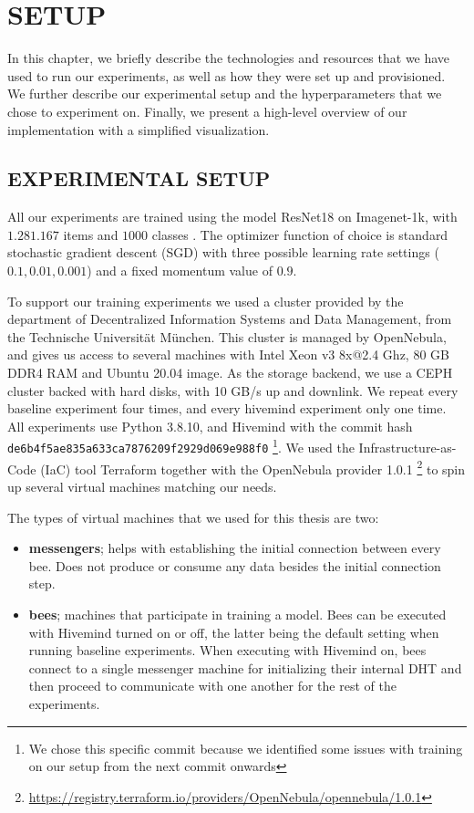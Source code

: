 \chapter{SETUP}\label{chapter:setup}

In this chapter, we briefly describe the technologies and resources that we have used to run our experiments, as well as how they were set up and provisioned.
We further describe our experimental setup and the hyperparameters that we chose to experiment on.
Finally, we present a high-level overview of our implementation with a simplified visualization.

\section{EXPERIMENTAL SETUP}

All our experiments are trained using the model ResNet18 \cite{he2015deep} on Imagenet-1k, with $1.281.167$ items and $1000$ classes \cite{deng2009imagenet}.
The optimizer function of choice is standard stochastic gradient descent (SGD) with three possible learning rate settings ($0.1, 0.01, 0.001$) and a fixed momentum value of $0.9$.

To support our training experiments we used a cluster provided by the department of Decentralized Information Systems and Data Management, from the Technische Universität München.
This cluster is managed by OpenNebula, and gives us access to several machines with Intel Xeon v3 8x@2.4 Ghz, 80 GB DDR4 RAM and Ubuntu 20.04 image.
As the storage backend, we use a CEPH cluster backed with hard disks, with 10 GB/s up and downlink.
We repeat every baseline experiment four times, and every hivemind experiment only one time.
All experiments use Python 3.8.10, and Hivemind with the commit hash \texttt{de6b4f5ae835a633ca7876209f2929d069e988f0}
\footnote{We chose this specific commit because we identified some issues with training on our setup from the next commit onwards}.
We used the Infrastructure-as-Code (IaC) tool Terraform together with the OpenNebula provider 1.0.1
\footnote{\href{https://registry.terraform.io/providers/OpenNebula/opennebula/1.0.1}{https://registry.terraform.io/providers/OpenNebula/opennebula/1.0.1}}
to spin up several virtual machines matching our needs.

The types of virtual machines that we used for this thesis are two:
\begin{itemize}
    \item \textbf{messengers}; helps with establishing the initial connection between every bee.
          Does not produce or consume any data besides the initial connection step.
    \item \textbf{bees}; machines that participate in training a model.
          Bees can be executed with Hivemind turned on or off, the latter being the default setting when running baseline experiments.
          When executing with Hivemind on, bees connect to a single messenger machine for initializing their internal DHT and then proceed to communicate with one another for the rest of the experiments.
\end{itemize}

